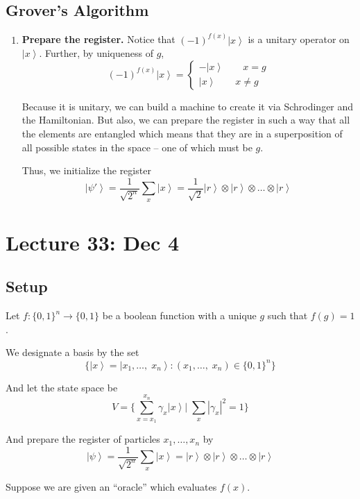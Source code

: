 \documentclass[12pt]{article}
\newcommand{\ket}[1]{\left\vert #1 \right\rangle}
\newcommand{\abs}[1]{\left\vert #1 \right\vert}
\begin{document}
    \subsection*{Grover's Algorithm}
        \begin{enumerate}
            \item \textbf{Prepare the register.} Notice that $(-1)^{f(x)}\ket{x}$ is a unitary operator on $\ket{x}$. Further, by uniqueness of $g$, 
            \[(-1)^{f(x)}\ket{x} = \begin{cases}
                -\ket{x} \qquad x = g\\
                \ket{x} \qquad x \neq g
            \end{cases}\]

            Because it is unitary, we can build a machine to create it via Schrodinger and the Hamiltonian. But also, we can prepare the register in such a way that all the elements are entangled which means that they are in a superposition of all possible states in the space -- one of which must be $g$. 

            Thus, we initialize the register 
            \[\ket{\psi'} = \frac{1}{\sqrt{2^n}} \sum_x \ket{x} = \frac{1}{\sqrt 2}\ket{r} \otimes \ket{r} \otimes \dots \otimes \ket{r}\]
            
        \end{enumerate}

\section*{Lecture 33: Dec 4}
    \subsection*{Setup}
        Let $f: \{0, 1\}^n \to \{0, 1\}$ be a boolean function with a unique $g$ such that $f(g) = 1$.
        
        We designate a basis by the set 
        \[\{\ket{x} = \ket{x_1, \dots,\; x_n} : (x_1, \dots,\; x_n) \in \{0, 1\}^n\}\]

        And let the state space be 
        \[V = \{\sum_{x = x_1}^{x_n} \gamma_x \ket{x} \bigg\vert \; \sum_x \abs{\gamma_x}^2 = 1\}\]

        And prepare the register of particles $x_1, \dots, x_n$ by 
        \[\ket{\psi} = \frac{1}{\sqrt{2^n}}\sum_x \ket{x} = \ket{r} \otimes \ket{r} \otimes \dots \otimes \ket{r}\]

        Suppose we are given an ``oracle'' which evaluates $f(x)$.
\end{document}
